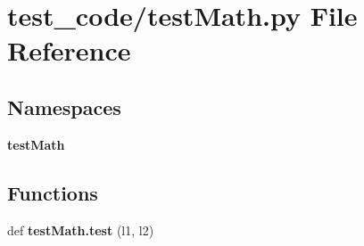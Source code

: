 \section{test\+\_\+code/test\+Math.py File Reference}
\label{test__code_2test_math_8py}
\subsection*{Namespaces}
\begin{DoxyCompactItemize}
\item 
 \textbf{ test\+Math}
\end{DoxyCompactItemize}
\subsection*{Functions}
\begin{DoxyCompactItemize}
\item 
def \textbf{ test\+Math.\+test} (l1, l2)
\end{DoxyCompactItemize}

